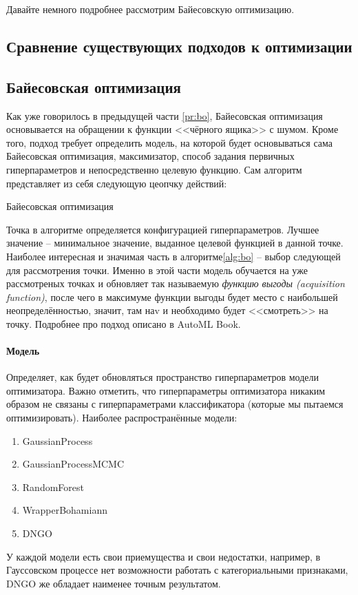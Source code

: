 \documentclass[times,specification,annotation]{itmo-student-thesis}
\begin{document}
	Давайте немного подробнее рассмотрим Байесовскую оптимизацию.
	
	\subsection{Сравнение существующих подходов к оптимизации} \label{ss:comparison}
	
	\subsection{Байесовская оптимизация} \label{ss:bo}
	Как уже говорилось в предыдущей части \ref{pr:bo}, Байесовская оптимизация основывается на обращении к функции <<чёрного ящика>> с шумом. Кроме того, подход требует определить модель, на которой будет основываться сама Байесовская оптимизация, максимизатор, способ задания первичных гиперпараметров и непосредственно целевую функцию. Сам алгоритм представляет из себя следующую цеопчку действий:
	
	\begin{algorithm}[!ht]
		\caption{Байесовская оптимизация}\label{alg:bo}
		\begin{algorithmic}
			\EndFor
		\end{algorithmic}
	\end{algorithm}

	Точка в алгоритме определяется конфигурацией гиперпараметров. Лучшее значение -- минимальное значение, выданное целевой функцией в данной точке. Наиболее интересная и значимая часть в алгоритме\ref{alg:bo} -- выбор следующей для рассмотрения точки. Именно в этой части модель обучается на уже рассмотреных точках и обновляет так называемую \textit{функцию выгоды (acquisition function)}, после чего в максимуме функции выгоды будет место с наибольшей неопределённостью, значит, там наv и необходимо будет <<смотреть>> на точку. Подробнее про подход описано в AutoML Book\cite{automlbook19a}.

	\paragraph{Модель} Определяет, как будет обновляться пространство гиперпараметров модели оптимизатора. Важно отметить, что гиперпараметры оптимизатора никаким образом не связаны с гиперпараметрами классификатора (которые мы пытаемся оптимизировать). Наиболее распространённые модели:
	\begin{enumerate}
		\item GaussianProcess \label{nm:gp}
		\item GaussianProcessMCMC
		\item RandomForest \label{nm:rf}
		\item WrapperBohamiann
		\item DNGO
	\end{enumerate}
	У каждой модели есть свои приемущества и свои недостатки, например, в Гауссовском процессе нет возможности работать с категориальными признаками, DNGO же обладает наименее точным результатом.
\end{document}
